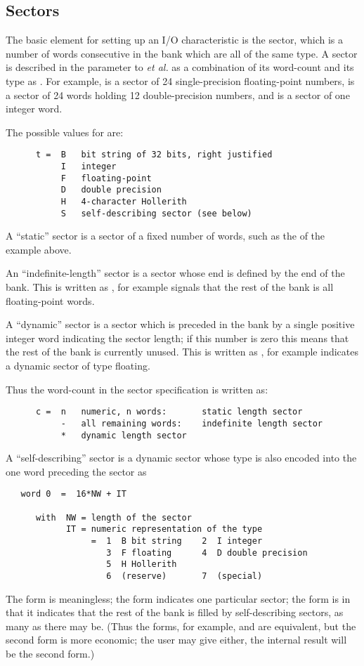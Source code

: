 \subsection*{Sectors}

The basic element for setting up an I/O characteristic is the sector,
which is a number of words consecutive in the bank which are
all of the same type.
A sector is described in the  parameter to  {\it et al.}
as a combination of its word-count  and 
its type  as  .
For example,  is a sector of 24 single-precision floating-point numbers,
 is a sector of 24 words holding 12 double-precision numbers,
and   is a sector of one integer word.

The possible values for  are:
\begin{verbatim}
      t =  B   bit string of 32 bits, right justified
           I   integer
           F   floating-point
           D   double precision
           H   4-character Hollerith
           S   self-describing sector (see below)
\end{verbatim} 
A ``static'' sector is a sector of a fixed number of words,
such as the  of the example above.

An ``indefinite-length'' sector is a sector whose end is defined
by the end of the bank.
This is written as  , for example    signals that the rest
of the bank is all floating-point words.

A ``dynamic'' sector is a sector which is preceded in the bank
by a single positive integer word indicating the sector length;
if this number is zero this means that the rest of
the bank is currently unused.
This is written as  , for example    indicates
a dynamic sector of type floating.


Thus the word-count  in the sector specification is written as:
\begin{verbatim}
      c =  n   numeric, n words:       static length sector
           -   all remaining words:    indefinite length sector
           *   dynamic length sector
\end{verbatim} 
A ``self-describing'' sector is a dynamic sector whose type
is also encoded into the one word preceding the sector as
\begin{verbatim}
   word 0  =  16*NW + IT

      with  NW = length of the sector
            IT = numeric representation of the type
                 =  1  B bit string    2  I integer
                    3  F floating      4  D double precision
                    5  H Hollerith
                    6  (reserve)       7  (special)
\end{verbatim} 
The form  is meaningless;
the form  indicates one particular sector;
the form  is  in that it indicates
that the rest of the bank is filled by self-describing sectors,
as many as there may be.
(Thus the forms, for example,  and  are
equivalent, but the second form is more economic;
the user may give either, the internal result will be the
second form.)

